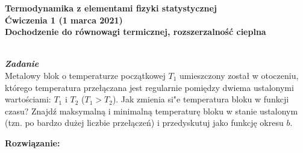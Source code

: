 \documentclass[11pt,a4paper]{article}
\newcounter{zadanie}\newcommand{\zadanie}[1][]{\addtocounter{zadanie}{1} ~\\  {\bf \emph{Zadanie \arabic{zadanie} #1 }} \\}
\begin{document}

\begin{centering}
\bf{\Large{Termodynamika z elementami fizyki statystycznej}}\\
Ćwiczenia 1 (1 marca 2021)\\[5mm]
Dochodzenie do równowagi termicznej, rozszerzalność cieplna \\
\end{centering}
\vspace{1mm}

\zadanie
Metalowy blok o temperaturze początkowej $T_1$ umieszczony został
w otoczeniu, którego temperatura przełączana jest regularnie
pomiędzy dwiema ustalonymi wartościami: $T_1$ i $T_2$ ($T_1>T_2$).
Jak zmienia si"e temperatura bloku w funkcji czasu?
Znajdź maksymalną i minimalną temperaturę bloku
w stanie ustalonym (tzn. po bardzo dużej liczbie przełączeń)
i przedyskutuj jako funkcję okresu $b$.
\begin{center}
\end{center}\vspace{-5mm}
\vskip 10pt
\textbf{Rozwiązanie:}
\end{document}
